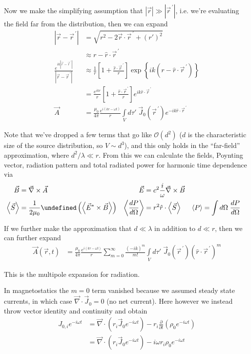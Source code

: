 \documentclass[10pt]{report}
\newcommand{\rd}[2]{\frac{d#1}{d#2}}
\newcommand{\pd}[2]{\frac{\partial #1}{\partial#2}}
\newcommand{\pvec}[1]{\vec{#1}^{\,\prime}}
\let\Re\undefined
\DeclareMathOperator{\Re}{Re}
\newcommand{\expvalue}[1]{\left<#1\right>}
\newcommand{\abs}[1]{\left|#1\right|}
\begin{document}
Now we make the simplifying assumption that $\abs{\vec{r}} \gg \abs{\pvec{r}}$, i.e. we're evaluating the field far from the distribution, then we can expand
\begin{align}
    \abs{\vec{r} - \pvec{r}} &= \sqrt{r^2 - 2\vec{r} \cdot \pvec{r} + \left( r' \right)^2}\\
    &\approx r - \hat{r} \cdot \pvec{r}\\
    \frac{e^{ik\abs{\vec{r} - \pvec{r}}}}{\abs{\vec{r} - \pvec{r}}} &\approx \frac{1}{r}\left[ 1 + \frac{\hat{r} \cdot \pvec{r}}{r}  \right] \exp\left\{ ik\left( r - \hat{r} \cdot \pvec{r} \right) \right\}\\
    &= \frac{e^{ikr}}{r}\left[ 1 + \frac{\hat{r} \cdot \pvec{r}}{r}  \right]e^{ik\hat{r} \cdot \pvec{r}}\\
    \vec{A} &= \frac{\mu_0}{4\pi}\frac{e^{i(kr - \omega t)}}{r}\int\limits_{V}^{}d\tau'\;\vec{J}_0(\pvec{r}) e^{-ik \hat{r} \cdot \pvec{r}}
\end{align}

Note that we've dropped a few terms that go like $\mathcal{O}(d^2)$ ($d$ is the characteristic size of the source distribution, so $V \sim d^3$), and this only holds in the ``far-field'' approximation, where $d^2/\lambda \ll r$. From this we can calculate the fields, Poynting vector, radiation pattern and total radiated power for harmonic time dependence via
\begin{align}
    \vec{B} &= \vec{\nabla} \times \vec{A} & \vec{E} &= c^2 \frac{i}{\omega}\vec{\nabla} \times \vec{B}\\
    \expvalue{\vec{S}} &= \frac{1}{2\mu_0}\Re\left( \expvalue{\vec{E}^* \times \vec{B}} \right) & \expvalue{\rd{P}{\Omega}} &= r^2 \hat{r} \cdot \expvalue{\vec{S}} & \expvalue{P} &= \int d\Omega \; \rd{P}{\Omega}
\end{align}

If we further make the approximation that $d \ll \lambda$ in addition to $d \ll r$, then we can further expand
\begin{align}
    \vec{A}(\vec{r},t) &= \frac{\mu_0}{4\pi}\frac{e^{i(kr - \omega t)}}{r}\sum\limits_{m=0}^{\infty}\frac{(-ik)^m}{m!}\int\limits_{V}^{}d\tau'\;\vec{J}_0(\pvec{r})\left( \hat{r} \cdot \pvec{r} \right)^m\label{5.31.multipole}
\end{align}

This is the multipole expansion for radiation.

In magnetostatics the $m=0$ term vanished because we assumed steady state currents, in which case $\vec{\nabla} \cdot \vec{J}_0 = 0$ (no net current). Here however we instead throw vector identity and continuity and obtain
\begin{align}
    J_{0,i} e^{-i \omega t} &= \vec{\nabla} \cdot \left( r_i \vec{J}_0 e^{-i \omega t} \right) - r_i\pd{}{t}\left( \rho_0e^{-i \omega t} \right)\\
    &= \vec{\nabla} \cdot \left( r_i \vec{J}_0 e^{-i \omega t} \right) - i\omega r_i\rho_0 e^{-i \omega t}
\end{align}
\end{document}

